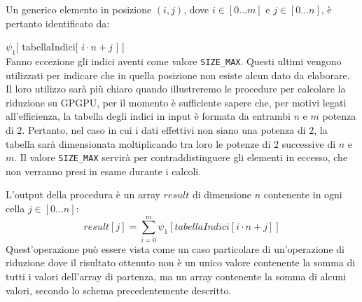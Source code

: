 \documentclass[a4paper]{article}   %
\begin{document}
Un generico elemento in posizione $(i, j)$, dove $i \in [0...m]$ e $j \in [0...n]$,
è pertanto identificato da:

$\psi_1$[ tabellaIndici[ $i \cdot n + j$ ] ]\\
Fanno eccezione gli indici aventi come valore {\tt SIZE\_MAX}. Questi ultimi vengono utilizzati per indicare che in quella posizione non esiste alcun dato da elaborare. \\
Il loro utilizzo sarà più chiaro quando illustreremo le procedure per calcolare la riduzione su GPGPU, per il momento è sufficiente sapere che, per motivi legati all’efficienza, la tabella degli indici in input è formata da entrambi $n$ e $m$  potenza di $2$. Pertanto, nel caso in cui i dati effettivi non siano una potenza di $2$, la tabella sarà dimensionata moltiplicando tra loro le potenze di $2$ successive di $n$ e $m$. Il valore {\tt SIZE\_MAX} servirà per contraddistinguere gli elementi in eccesso, che non verranno presi in esame durante i calcoli.

L'output della procedura è un array $result$ di dimensione $n$ contenente in ogni cella $j \in [0...n]$: %
\begin{equation}
result[ j ] =  \sum_{i=0}^{m} \psi_1 [ tabellaIndici[ i \cdot n + j ] ]
\end{equation}
Quest’operazione può essere vista come un caso particolare di un’operazione di riduzione dove il risultato ottenuto non è un unico valore contenente la somma di tutti i valori dell’array di partenza, ma un array contenente la somma di alcuni valori, secondo lo schema precedentemente descritto.
\end{document}

